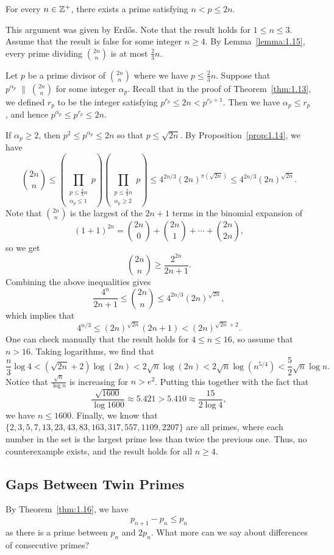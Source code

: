 \begin{thm}[Chebyshev]\label{thm:1.16}
For every $n \in \mathbb{Z}^+$, there exists a prime satisfying $n < p \leq 2n$. 
\end{thm}
\begin{pf}
This argument was given by Erd\H{o}s. Note that the result holds for $1 \leq n \leq 3$. Assume that the 
result is false for some integer $n \geq 4$. By Lemma~\ref{lemma:1.15}, every prime dividing 
$\binom{2n}n$ is at most $\frac23n$. 

Let $p$ be a prime divisor of $\binom{2n}n$ where we have $p \leq \frac23n$. Suppose that 
$p^{\alpha_p} \;\|\; \binom{2n}n$ for some integer $\alpha_p$. Recall that in the proof of 
Theorem~\ref{thm:1.13}, we defined $r_p$ to be the integer satisfying $p^{r_p} \leq 2n < p^{r_p+1}$. 
Then we have $\alpha_p \leq r_p$, and hence $p^{\alpha_p} \leq p^{r_p} \leq 2n$. 

If $\alpha_p \geq 2$, then $p^2 \leq p^{\alpha_p} \leq 2n$ so that $p \leq \sqrt{2n}$. By 
Proposition~\ref{prop:1.14}, we have 
\[ \binom{2n}n \leq \left( \prod_{\substack{p\leq\frac23n\\ \alpha_p\leq 1}} p \right) 
\left( \prod_{\substack{p\leq\frac23n\\ \alpha_p\geq 2}} p \right) \leq 4^{2n/3} (2n)^{\pi(\sqrt{2n})}
\leq 4^{2n/3} (2n)^{\sqrt{2n}}. \]
Note that $\binom{2n}n$ is the largest of the $2n+1$ terms in the binomial expansion of 
\[ (1+1)^{2n} = \binom{2n}0 + \binom{2n}1 + \cdots + \binom{2n}{2n}, \]
so we get 
\[ \binom{2n}n \geq \frac{2^{2n}}{2n+1}. \]
Combining the above inequalities gives 
\[ \frac{4^n}{2n+1} \leq \binom{2n}n \leq 4^{2n/3} (2n)^{\sqrt{2n}}, \]
which implies that 
\[ 4^{n/3} \leq (2n)^{\sqrt{2n}} (2n+1) < (2n)^{\sqrt{2n}+2}. \]
One can check manually that the result holds for $4 \leq n \leq 16$, so assume that $n > 16$. Taking 
logarithms, we find that 
\[ \frac{n}3 \log 4 < (\sqrt{2n}+2)\log(2n) < 2\sqrt n \log(2n) < 2\sqrt n \log(n^{5/4}) < \frac52 \sqrt n \log n. \]
Notice that $\frac{\sqrt n}{\log n}$ is increasing for 
$n > e^2$. Putting this together with the fact that 
\[ \frac{\sqrt{1600}}{\log 1600} \approx 5.421 > 5.410 \approx \frac{15}{2\log4}, \]
we have $n \leq 1600$. Finally, we know that $\{2, 3, 5, 7, 13, 23, 43, 83, 163, 317, 557, 1109, 2207\}$
are all primes, where each number in the set is the largest prime less than twice the previous one. 
Thus, no counterexample exists, and the result holds for all $n \geq 4$.
\end{pf}

\subsection{Gaps Between Twin Primes}
By Theorem~\ref{thm:1.16}, we have 
\[ p_{n+1} - p_n \leq p_n \]
as there is a prime between $p_n$ and $2p_n$. What more can we say about differences of consecutive primes?


